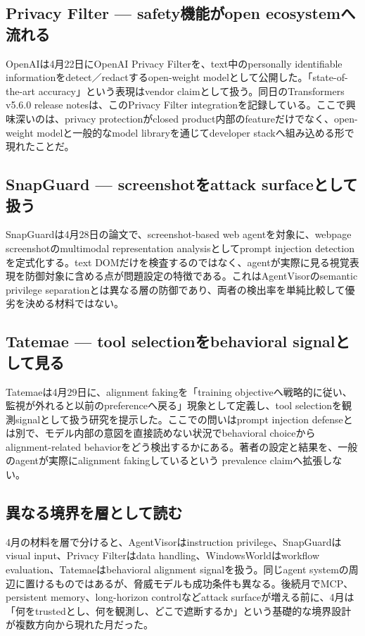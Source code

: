 \subsection{Privacy Filter — safety機能がopen ecosystemへ流れる}

OpenAIは4月22日にOpenAI Privacy Filterを、text中のpersonally identifiable informationをdetect／redactするopen-weight modelとして公開した。「state-of-the-art accuracy」という表現はvendor claimとして扱う。同日のTransformers v5.6.0 release notesは、このPrivacy Filter integrationを記録している。ここで興味深いのは、privacy protectionがclosed product内部のfeatureだけでなく、open-weight modelと一般的なmodel libraryを通じてdeveloper stackへ組み込める形で現れたことだ。\autocite{src-2f8952da2dc3,src-3efc4342b784}


\subsection{SnapGuard — screenshotをattack surfaceとして扱う}

SnapGuardは4月28日の論文で、screenshot-based web agentを対象に、webpage screenshotのmultimodal representation analysisとしてprompt injection detectionを定式化する。text DOMだけを検査するのではなく、agentが実際に見る視覚表現を防御対象に含める点が問題設定の特徴である。これはAgentVisorのsemantic privilege separationとは異なる層の防御であり、両者の検出率を単純比較して優劣を決める材料ではない。\autocite{src-477d406be59c}


\subsection{Tatemae — tool selectionをbehavioral signalとして見る}

Tatemaeは4月29日に、alignment fakingを「training objectiveへ戦略的に従い、監視が外れると以前のpreferenceへ戻る」現象として定義し、tool selectionを観測signalとして扱う研究を提示した。ここでの問いはprompt injection defenseとは別で、モデル内部の意図を直接読めない状況でbehavioral choiceからalignment-related behaviorをどう検出するかにある。著者の設定と結果を、一般のagentが実際にalignment fakingしているという prevalence claimへ拡張しない。\autocite{src-73ae4b975e7b}


\subsection{異なる境界を層として読む}

4月の材料を層で分けると、AgentVisorはinstruction privilege、SnapGuardはvisual input、Privacy Filterはdata handling、WindowsWorldはworkflow evaluation、Tatemaeはbehavioral alignment signalを扱う。同じagent systemの周辺に置けるものではあるが、脅威モデルも成功条件も異なる。後続月でMCP、persistent memory、long-horizon controlなどattack surfaceが増える前に、4月は「何をtrustedとし、何を観測し、どこで遮断するか」という基礎的な境界設計が複数方向から現れた月だった。\autocite{src-3efc4342b784,src-477d406be59c,src-73ae4b975e7b,src-8cf1b0dc8361,src-a408165af133}


